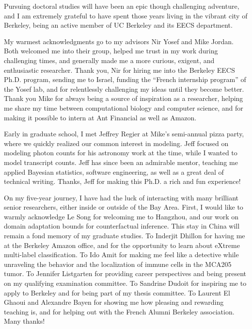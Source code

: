 \begin{acknowledgements}

Pursuing doctoral studies will have been an epic though challenging adventure, and I am extremely grateful to have spent those years living in the vibrant city of Berkeley, being an active member of UC Berkeley and its EECS department. 

My warmest acknowledgments go to my advisors Nir Yosef and Mike Jordan. Both welcomed me into their group, helped me trust in my work during challenging times, and generally made me a more curious, exigent, and enthusiastic researcher. Thank you, Nir for hiring me into the Berkeley EECS Ph.D. program, sending me to Israel, funding the ``French internship program'' of the Yosef lab, and for relentlessly challenging my ideas until they become better. Thank you Mike for always being a source of inspiration as a researcher, helping me share my time between computational biology and computer science, and for making it possible to intern at Ant Financial as well as Amazon. 

Early in graduate school, I met Jeffrey Regier at Mike's semi-annual pizza party, where we quickly realized our common interest in modeling.  Jeff focused on modeling photon counts for his astronomy work at the time, while I wanted to model transcript counts. Jeff has since been an admirable mentor, teaching me applied Bayesian statistics, software engineering, as well as a great deal of technical writing. Thanks, Jeff for making this Ph.D. a rich and fun experience! 

On my five-year journey, I have had the luck of interacting with many brilliant senior researchers, either inside or outside of the Bay Area. First, I would like to warmly acknowledge Le Song for welcoming me to Hangzhou, and our work on domain adaptation bounds for counterfactual inference. This stay in China will remain a fond memory of my graduate studies. To Inderjit Dhillon for having me at the Berkeley Amazon office, and for the opportunity to learn about eXtreme multi-label classification. To Ido Amit for making me feel like a detective while unraveling the behavior and the localization of immune cells in the MCA205 tumor. To Jennifer Listgarten for providing career perspectives and being present on my qualifying examination committee. To Sandrine Dudoit for inspiring me to apply to Berkeley and for being part of my thesis committee. To Laurent El Ghaoui and Alexandre Bayen for showing me how pleasing and rewarding teaching is, and for helping out with the French Alumni Berkeley association. Many thanks!


\end{acknowledgements}
